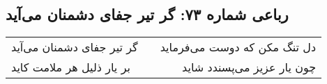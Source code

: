 \begin{center}
\section*{رباعی شماره ۷۳: گر تیر جفای دشمنان می‌آید}
\label{sec:073}
\begin{longtable}{l p{0.5cm} r}
گر تیر جفای دشمنان می‌آید
&&
دل تنگ مکن که دوست می‌فرماید
\\
بر یار ذلیل هر ملامت کاید
&&
چون یار عزیز می‌پسندد شاید
\\
\end{longtable}
\end{center}

